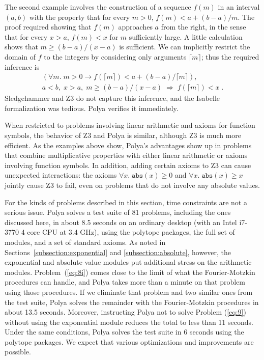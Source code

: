 \documentclass[runningheds]{llncs}
\newcommand{\myRightarrow}{\; \Rightarrow \;}
\newcommand{\fn}[1]{\mathtt{#1}} \newcommand{\nroot}{\fn{root}}
\begin{document}
The second example involves the construction of a sequence $f(m)$ in an interval $(a, b)$ with the property that for every $m > 0$, $f(m) < a + (b - a) / m$. The proof required showing that $f(m)$ approaches $a$ from the right, in the sense that for every $x > a$, $f(m) < x$ for $m$ sufficiently large. A little calculation shows that $m \geq (b - a) / (x - a)$ is sufficient. We can implicitly restrict the domain of $f$ to the integers by considering only arguments $\lceil m \rceil$; thus the required inference is
\begin{multline}
(\forall m. \; m > 0 \rightarrow f(\lceil m \rceil) < a + (b - a) / \lceil m \rceil), \\
a < b, \; x > a, \; m \geq (b - a) / (x - a) \myRightarrow f(\lceil m \rceil) < x\;. 
\end{multline}
Sledgehammer and Z3 do not capture this inference, and the Isabelle formalization was tedious. Polya verifies it immediately.

When restricted to problems involving linear arithmetic and axioms for function symbols, the behavior of Z3 and Polya is similar, although Z3 is much more efficient. As the examples above show, Polya's advantages show up in problems that combine multiplicative properties with either linear arithmetic or axioms involving function symbols. In addition, adding certain axioms to Z3 can cause unexpected interactions: the axioms $\forall x. \; \fn{abs}(x)\geq 0$ and $\forall x. \; \fn{abs}(x) \geq x$ jointly cause Z3 to fail, even on problems that do not involve any absolute values.

For the kinds of problems described in this section, time constraints are not a serious issue. Polya solves a test suite of 81 problems, including the ones discussed here, in about 8.5 seconds on an ordinary desktop (with an Intel i7-3770 4 core CPU at 3.4 GHz), using the polytope packages, the full set of modules, and a set of standard axioms. As noted in Sections~\ref{subsection:exponential} and \ref{subsection:absolute}, however, the exponential and absolute value modules put additional stress on the arithmetic modules. Problem~(\ref{eq:8i}) comes close to the limit of what the Fourier-Motzkin procedures can handle, and Polya takes more than a minute on that problem using those procedures. If we eliminate that problem and two similar ones from the test suite, Polya solves the remainder with the Fourier-Motzkin procedures in about 13.5 seconds. Moreover, instructing Polya not to solve Problem (\ref{eq:9}) without using the exponential module reduces the total to less than 11 seconds. Under the same conditions, Polya solves the test suite in 6 seconds using the polytope packages. We expect that various optimizations and improvements are possible.
\end{document}
